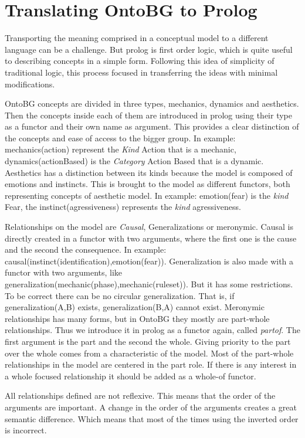 \section{Translating OntoBG to Prolog}

Transporting the meaning comprised in a conceptual model to a different language can be a challenge. But prolog is first order logic, which is quite useful to describing concepts in a simple form. Following this idea of simplicity of traditional logic, this process focused in transferring the ideas with minimal modifications.

OntoBG concepts are divided in three types, mechanics, dynamics and aesthetics. Then the concepts inside each of them are introduced in prolog using their type as a functor and their own name as argument. This provides a clear distinction of the concepts and ease of access to the bigger group. In example: mechanics(action) represent the \textit{Kind} Action that is a mechanic, dynamics(actionBased) is the \textit{Category} Action Based that is a dynamic. Aesthetics has a distinction between its kinds because the model is composed of emotions and instincts. This is brought to the model as different functors, both representing concepts of aesthetic model. In example: emotion(fear) is the \textit{kind} Fear, the instinct(agressiveness) represents the \textit{kind} agressiveness. 

Relationships on the model are \textit{Causal}, Generalizations or meronymic. Causal is directly created in a functor with two arguments, where the first one is the cause and the second the consequence. In example: causal(instinct(identification),emotion(fear)). Generalization is also made with a functor with two arguments, like generalization(mechanic(phase),mechanic(ruleset)). But it has some restrictions. To be correct there can be no circular generalization. That is, if generalization(A,B) exists, generalization(B,A) cannot exist. Meronymic relationships has many forms, but in OntoBG they mostly are part-whole relationships. Thus we introduce it in prolog as a functor again, called \textit{partof}. The first argument is the part and the second the whole. Giving priority to the part over the whole comes from a characteristic of the model. Most of the part-whole relationships in the model are centered in the part role. If there is any interest in a whole focused relationship it should be added as a whole-of functor. 

All relationships defined are not reflexive. This means that the order of the arguments are important. A change in the order of the arguments creates a great semantic difference. Which means that most of the times using the inverted order is incorrect. 

